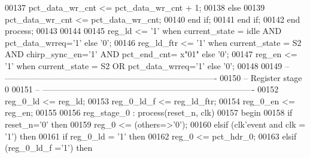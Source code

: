 \begin{DoxyCode}
00137             \textcolor{vhdlchar}{pct_data_wr_cnt} \textcolor{vhdlchar}{<=} \textcolor{vhdlchar}{pct_data_wr_cnt} \textcolor{vhdlchar}{+} \textcolor{vhdllogic}{}\textcolor{vhdllogic}{1};
00138          \textcolor{keywordflow}{else} 
00139             \textcolor{vhdlchar}{pct_data_wr_cnt} \textcolor{vhdlchar}{<=} \textcolor{vhdlchar}{pct_data_wr_cnt};
00140          \textcolor{keywordflow}{end} \textcolor{keywordflow}{if};
00141       \textcolor{keywordflow}{end} \textcolor{keywordflow}{if};
00142    \textcolor{keywordflow}{end} \textcolor{keywordflow}{process};
00143    
00144   
00145    reg\_ld <= '1' \textcolor{keywordflow}{when} current\_state = idle \textcolor{keywordflow}{AND} pct\_data\_wrreq='1' \textcolor{keywordflow}{else} '0';
00146     reg\_ld\_ftr <= '1' \textcolor{keywordflow}{when} current\_state = S2 \textcolor{keywordflow}{AND} chirp\_sync\_en='1' \textcolor{keywordflow}{AND} pct\_end\_cnt= x"01" \textcolor{keywordflow}{else} '0';
00147    reg\_en <= '1' \textcolor{keywordflow}{when} current\_state = S2 \textcolor{keywordflow}{OR} pct\_data\_wrreq='1' \textcolor{keywordflow}{else} '0';
00148    
00149 \textcolor{keyword}{-- ----------------------------------------------------------------------------}
00150 \textcolor{keyword}{-- Register stage 0}
00151 \textcolor{keyword}{-- ----------------------------------------------------------------------------   }
00152    reg\_0\_ld <= reg\_ld;
00153     reg\_0\_ld\_f <= reg\_ld\_ftr;
00154    reg\_0\_en <= reg\_en;
00155 
00156  reg\_stage\_0 : \textcolor{keywordflow}{process}(reset_n, clk)
00157 \textcolor{vhdlkeyword}{   begin}
00158       \textcolor{keywordflow}{if} \textcolor{vhdlchar}{reset_n}\textcolor{vhdlchar}{=}\textcolor{vhdlchar}{'}\textcolor{vhdllogic}{}\textcolor{vhdllogic}{0}\textcolor{vhdlchar}{'} \textcolor{keywordflow}{then}
00159          reg\_0 <= (others=>'0');
00160       \textcolor{keywordflow}{elsif} \textcolor{vhdlchar}{(}\textcolor{vhdlchar}{clk}\textcolor{vhdlchar}{'}\textcolor{vhdlkeyword}{event} \textcolor{keywordflow}{and} \textcolor{vhdlchar}{clk} \textcolor{vhdlchar}{=} \textcolor{vhdlchar}{'}\textcolor{vhdllogic}{}\textcolor{vhdllogic}{1}\textcolor{vhdlchar}{'}\textcolor{vhdlchar}{)} \textcolor{keywordflow}{then}
00161          \textcolor{keywordflow}{if} \textcolor{vhdlchar}{reg_0_ld} \textcolor{vhdlchar}{=} \textcolor{vhdlchar}{'}\textcolor{vhdllogic}{}\textcolor{vhdllogic}{1}\textcolor{vhdlchar}{'} \textcolor{keywordflow}{then} 
00162             reg\_0 <= pct\_hdr\_0;
00163             \textcolor{keywordflow}{elsif} \textcolor{vhdlchar}{(}\textcolor{vhdlchar}{reg_0_ld_f} \textcolor{vhdlchar}{=}\textcolor{vhdlchar}{'}\textcolor{vhdllogic}{}\textcolor{vhdllogic}{1}\textcolor{vhdlchar}{'}\textcolor{vhdlchar}{)} \textcolor{keywordflow}{then}

\end{DoxyCode}
